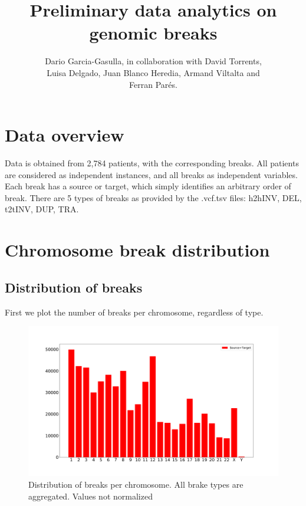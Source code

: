 \documentclass[a4paper,10pt]{article}
\title{Preliminary data analytics on genomic breaks}
\author{Dario Garcia-Gasulla, in collaboration with David Torrents,\\ Luisa Delgado, Juan Blanco Heredia, Armand Viltalta and \\Ferran Par\'{e}s. }
\begin{document}
\maketitle


\section*{Data overview}

Data is obtained from 2,784 patients, with the corresponding breaks. All patients are considered as independent instances, and all breaks as independent variables. Each break has a source or target, which simply identifies an arbitrary order of break. There are 5 types of breaks as provided by the .vcf.tsv files: h2hINV, DEL, t2tINV, DUP, TRA.


\section*{Chromosome break distribution}

\subsection*{Distribution of breaks}

First we plot the number of breaks per chromosome, regardless of type.

\begin{figure}[H]
\includegraphics[scale=0.2]{figures/All_Break_distribution_unnormalized.pdf}
\caption{Distribution of breaks per chromosome. All brake types are aggregated. Values not normalized}
\end{figure}
\end{document}
